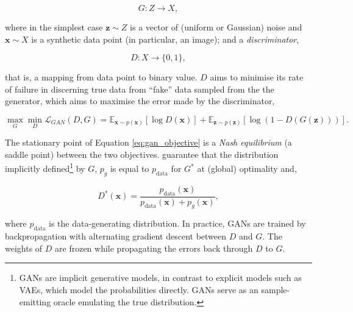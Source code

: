 \begin{equation}
G : Z \to X,
\end{equation}

where in the simplest case $\mathbf{z} \sim Z$ is a vector of (uniform or Gaussian) noise and $\mathbf{x} \sim X$ is a synthetic data point (in particular, an image); and a \emph{discriminator},

\begin{equation}
D : X \to \{0, 1\},
\end{equation}

that is, a mapping from data point to binary value. $D$ aims to minimise its rate of failure in discerning true data from ``fake'' data sampled from the the generator, which aims to maximise the error made by the discriminator,

\begin{equation}
\max_G\min_D\mathcal{L}_{GAN}(D, G) = \mathbb{E}_{\mathbf{x} \sim p(\mathbf{x})}[\log D(\mathbf{x})] + \mathbb{E}_{\mathbf{z} \sim p(\mathbf{z})}[\log(1 - D(G(\mathbf{z})))].
\label{eq:gan_objective}
\end{equation}

The stationary point of Equation \ref{eq:gan_objective} is a \emph{Nash equilibrium} (a saddle point) between the two objectives. \cite{goodfellow2014generative} guarantee that the distribution implicitly defined\footnote{GANs are implicit generative models, in contrast to explicit models such as VAEs, which model the probabilities directly. GANs serve as an sample-emitting oracle emulating the true distribution.} by $G$, $p_g$ is equal to $p_{\text{data}}$ for $G^*$ at (global) optimality and,

\begin{equation}
D^*(\mathbf{x}) = \frac{p_{\text{data}}(\mathbf{x})}{p_{\text{data}}(\mathbf{x}) + p_{g}(\mathbf{x})},
\end{equation}

where $p_{\text{data}}$ is the data-generating distribution. In practice, GANs are trained by backpropagation with alternating gradient descent between $D$ and $G$. The weights of $D$ are frozen while propagating the errors back through $D$ to $G$.

